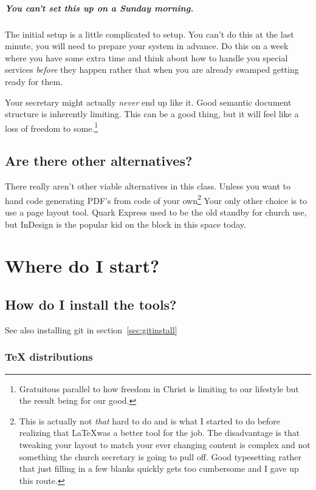 \documentclass[12pt]{scrartcl}
\begin{document}
\subparagraph{You can't set this up on a Sunday morning.}

The initial setup is a little complicated to setup. You can't do this at the
last minute, you will need to prepare your system in advance. Do this on a week
where you have some extra time and think about how to handle you special
services \emph{before} they happen rather that when you are already swamped
getting ready for them.

Your secretary might actually \emph{never} end up like it. Good semantic
document structure is inherently limiting. This can be a good thing, but it will
feel like a loss of freedom to some.\footnote{Gratuitous parallel to how freedom
	in Christ is limiting to our lifestyle but the result being for our
	good.}

\subsection{Are there other alternatives?}

There really aren't other viable alternatives in this class. Unless you want to
hand code generating PDF's from code of your own\footnote{This is actually not
	\emph{that} hard to do and is what I started to do before realizing that
	\LaTeX was a better tool for the job. The disadvantage is that tweaking
	your layout to match your ever changing content is complex and not
	something the church secretary is going to pull off. Good typesetting
	rather that just filling in a few blanks quickly gets too cumbersome and
	I gave up this route.} Your only other choice is to use a page layout
tool. Quark Express used to be the old standby for church use, but InDesign is
the popular kid on the block in this space today.

\section{Where do I start?}

\subsection{How do I install the tools?}
\label{sec:install}

See also installing git in section~\vref{sec:gitinstall}

\subsubsection{TeX distributions}
\end{document}
